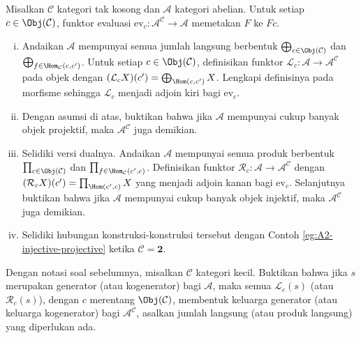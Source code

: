 \begin{Exercises}
	\item Misalkan $\mathcal{C}$ kategori tak kosong dan $\mathcal{A}$ kategori
	abelian. Untuk setiap $c\in\Obj(\mathcal{C})$, funktor evaluasi
	$\mathrm{ev}_c:\mathcal{A}^{\mathcal{C}}\to\mathcal{A}$ memetakan $F$
	ke $Fc$.
	\begin{enumerate}[(i)]
		\item Andaikan $\mathcal{A}$ mempunyai semua jumlah langsung berbentuk
		$\bigoplus_{c\in\Obj(\mathcal{C})}$ dan
		$\bigoplus_{f\in\Hom_{\mathcal{C}}(c,c')}$. Untuk setiap
		$c\in\Obj(\mathcal{C})$, definisikan funktor
		$\mathcal{L}_c:\mathcal{A}\to\mathcal{A}^{\mathcal{C}}$ pada objek
		dengan
		$(\mathcal{L}_cX)(c')=\bigoplus_{\Hom(c,c')}X$. Lengkapi definisinya pada
		morfisme sehingga $\mathcal{L}_c$ menjadi adjoin kiri bagi
		$\mathrm{ev}_c$.
		\item Dengan asumsi di atas, buktikan bahwa jika $\mathcal{A}$ mempunyai
		cukup banyak objek projektif, maka $\mathcal{A}^{\mathcal{C}}$ juga
		demikian.
		\item Selidiki versi dualnya. Andaikan $\mathcal{A}$ mempunyai semua
		produk berbentuk $\prod_{c\in\Obj(\mathcal{C})}$ dan
		$\prod_{f\in\Hom_{\mathcal{C}}(c',c)}$. Definisikan funktor
		$\mathcal{R}_c:\mathcal{A}\to\mathcal{A}^{\mathcal{C}}$ dengan
		$(\mathcal{R}_cX)(c')=\prod_{\Hom(c',c)}X$ yang menjadi adjoin kanan
		bagi $\mathrm{ev}_c$. Selanjutnya buktikan bahwa jika $\mathcal{A}$
		mempunyai cukup banyak objek injektif, maka
		$\mathcal{A}^{\mathcal{C}}$ juga demikian.
		\item Selidiki hubungan konstruksi-konstruksi tersebut dengan Contoh
		\ref{eg:A2-injective-projective} ketika $\mathcal{C}=\mathbf{2}$.
	\end{enumerate}

	\item Dengan notasi soal sebelumnya, misalkan $\mathcal{C}$ kategori kecil.
	Buktikan bahwa jika $s$ merupakan generator (atau kogenerator) bagi
	$\mathcal{A}$, maka semua $\mathcal{L}_c(s)$ (atau $\mathcal{R}_c(s)$),
	dengan $c$ merentang $\Obj(\mathcal{C})$, membentuk keluarga generator
	(atau keluarga kogenerator) bagi $\mathcal{A}^{\mathcal{C}}$, asalkan
	jumlah langsung (atau produk langsung) yang diperlukan ada.


\end{Exercises}
